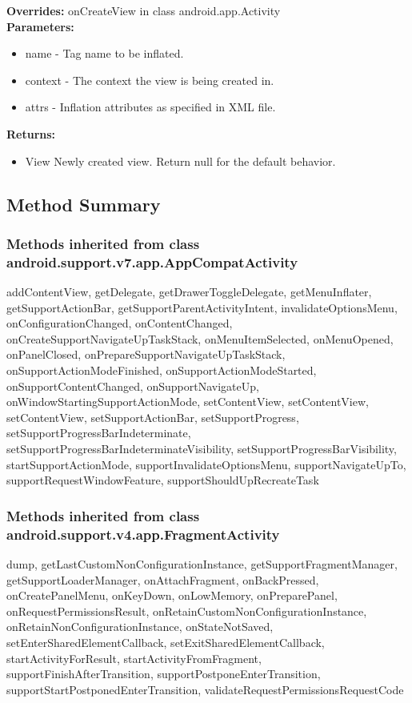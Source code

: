 \textbf{Overrides:}
\tab         onCreateView in class android.app.Activity\\

\textbf{Parameters:}
\begin{itemize}
\item name - Tag name to be inflated.
\item context - The context the view is being created in.
\item attrs - Inflation attributes as specified in XML file.
\end{itemize}

\textbf{Returns:}
\begin{itemize}
\item View Newly created view. Return null for the default behavior.
\end{itemize}

\subsection{Method Summary}

\subsubsection{Methods inherited from class android.support.v7.app.AppCompatActivity}

addContentView, getDelegate, getDrawerToggleDelegate, getMenuInflater, getSupportActionBar, getSupportParentActivityIntent, invalidateOptionsMenu, onConfigurationChanged, onContentChanged, onCreateSupportNavigateUpTaskStack, onMenuItemSelected, onMenuOpened, onPanelClosed, onPrepareSupportNavigateUpTaskStack, onSupportActionModeFinished, onSupportActionModeStarted, onSupportContentChanged, onSupportNavigateUp, onWindowStartingSupportActionMode, setContentView, setContentView, setContentView, setSupportActionBar, setSupportProgress, setSupportProgressBarIndeterminate, setSupportProgressBarIndeterminateVisibility, setSupportProgressBarVisibility, startSupportActionMode, supportInvalidateOptionsMenu, supportNavigateUpTo, supportRequestWindowFeature, supportShouldUpRecreateTask\\

\subsubsection{Methods inherited from class android.support.v4.app.FragmentActivity}

dump, getLastCustomNonConfigurationInstance, getSupportFragmentManager, getSupportLoaderManager, onAttachFragment, onBackPressed, onCreatePanelMenu, onKeyDown, onLowMemory, onPreparePanel, onRequestPermissionsResult, onRetainCustomNonConfigurationInstance, onRetainNonConfigurationInstance, onStateNotSaved, setEnterSharedElementCallback, setExitSharedElementCallback, startActivityForResult, startActivityFromFragment, supportFinishAfterTransition, supportPostponeEnterTransition, supportStartPostponedEnterTransition, validateRequestPermissionsRequestCode\\


